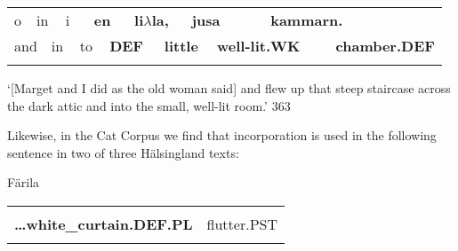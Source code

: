 \begin{tabular}{llllllllllllll}
\lsptoprule
o & \multicolumn{2}{l}{in

} & \multicolumn{2}{l}{i

} & \multicolumn{2}{l}{{\bfseries en}

} & \multicolumn{2}{l}{{\bfseries li$\lambda $la,}

} & \multicolumn{2}{l}{{\bfseries jusa}

} & \multicolumn{2}{l}{{\bfseries kammarn.}

} & \\
\multicolumn{2}{l}{and

} & \multicolumn{2}{l}{in

} & \multicolumn{2}{l}{to 

} & \multicolumn{2}{l}{{\bfseries DEF}

} & \multicolumn{2}{l}{{\bfseries little}

} & \multicolumn{2}{l}{{\bfseries well-lit.WK}

} & \multicolumn{2}{l}{{\bfseries chamber.DEF}

}\\
\lspbottomrule
\end{tabular}

\begin{styleTranslation}
‘[Marget and I did as the old woman said] and flew up that steep staircase across the dark attic and into the small, well-lit room.’ 363

\end{styleTranslation}

\begin{styleBodytextC}
Likewise, in the Cat Corpus we find that incorporation is used in the following sentence in two of three Hälsingland texts:

\end{styleBodytextC}

\begin{listWWNumileveli}
\item 

\end{listWWNumileveli}

\begin{styleExLtrTblii}
Färila

\end{styleExLtrTblii}

\begin{tabular}{ll}
\lsptoprule
\multicolumn{2}{l}{{\bfseries …vitgardinân}

}\\
{\bfseries …white\_curtain.DEF.PL} & flutter.PST\\
\lspbottomrule
\end{tabular}

